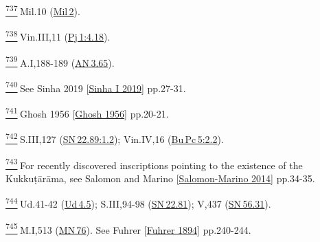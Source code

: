 \label{footprints_split_025.html_fn737}
\hyperref[footprints_split_019.htmlux5cux23fnref737]{\textsuperscript{737}} Mil.10
(\href{https://suttacentral.net/mil2}{Mil\,2}).

\label{footprints_split_025.html_fn738}
\hyperref[footprints_split_019.htmlux5cux23fnref738]{\textsuperscript{738}} Vin.III,11
(\href{https://suttacentral.net/pli-tv-bu-vb-pj1/en/brahmali\#4.18}{Pj\,1:4.18}).

\label{footprints_split_025.html_fn739}
\hyperref[footprints_split_019.htmlux5cux23fnref739]{\textsuperscript{739}} A.I,188-189
(\href{https://suttacentral.net/an3.65/en/sujato}{AN\,3.65}).

\label{footprints_split_025.html_fn740}
\hyperref[footprints_split_019.htmlux5cux23fnref740]{\textsuperscript{740}} See
{Sinha 2019
{{[}\hyperref[footprints_split_022.htmlux5cux23Sinhaux5cux2520Iux5cux25202019]{Sinha
I 2019}{]}}} pp.27-31.

\label{footprints_split_025.html_fn741}
\hyperref[footprints_split_019.htmlux5cux23fnref741]{\textsuperscript{741}} {Ghosh
1956
{{[}\hyperref[footprints_split_022.htmlux5cux23Ghoshux5cux25201956]{Ghosh
1956}{]}}} pp.20-21.

\label{footprints_split_025.html_fn742}
\hyperref[footprints_split_019.htmlux5cux23fnref742]{\textsuperscript{742}} S.III,127
(\href{https://suttacentral.net/sn22.89/en/sujato\#1.2}{SN\,22.89:1.2});
Vin.IV,16
(\href{https://suttacentral.net/pli-tv-bu-vb-pc5/en/brahmali\#2.2}{Bu\,Pc\,5:2.2}).

\label{footprints_split_025.html_fn743}
\hyperref[footprints_split_019.htmlux5cux23fnref743]{\textsuperscript{743}} For
recently discovered inscriptions pointing to the existence of the
Kukkuṭārāma, see {Salomon and Marino
{{[}\hyperref[footprints_split_022.htmlux5cux23Salomon-Marinoux5cux25202014]{Salomon-Marino
2014}{]}}} pp.34-35.

\label{footprints_split_025.html_fn744}
\hyperref[footprints_split_019.htmlux5cux23fnref744]{\textsuperscript{744}} Ud.41-42
(\href{https://suttacentral.net/ud4.5/en/sujato}{Ud\,4.5}); S.III,94-98
(\href{https://suttacentral.net/sn22.81/en/sujato}{SN\,22.81}); V,437
(\href{https://suttacentral.net/sn56.31/en/sujato}{SN\,56.31}).

\label{footprints_split_025.html_fn745}
\hyperref[footprints_split_019.htmlux5cux23fnref745]{\textsuperscript{745}} M.I,513
(\href{https://suttacentral.net/mn76/en/sujato}{MN\,76}). See {Fuhrer
{{[}\hyperref[footprints_split_022.htmlux5cux23Fuhrerux5cux25201894]{Fuhrer
1894}{]}}} pp.240-244.

